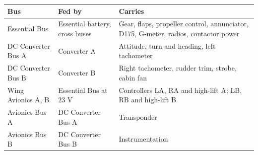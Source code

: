 \begin{tabularx}{\textwidth}{@{}>{\raggedright\arraybackslash}p{34mm}>{\raggedright\arraybackslash}p{38mm}>{\raggedright\arraybackslash}X@{}}
\toprule
\textbf{Bus} & \textbf{Fed by} & \textbf{Carries} \\
\midrule
Essential Bus & Essential battery, cross buses & Gear, flaps, propeller control, annunciator, D175, G-meter, radios, contactor power \\
DC Converter Bus A & Converter A & Attitude, turn and heading, left tachometer \\
DC Converter Bus B & Converter B & Right tachometer, rudder trim, strobe, cabin fan \\
Wing Avionics A, B & Essential Bus at 23 V & Controllers LA, RA and high-lift A; LB, RB and high-lift B \\
Avionics Bus A & DC Converter Bus A & Transponder \\
Avionics Bus B & DC Converter Bus B & Instrumentation \\
\bottomrule
\end{tabularx}
